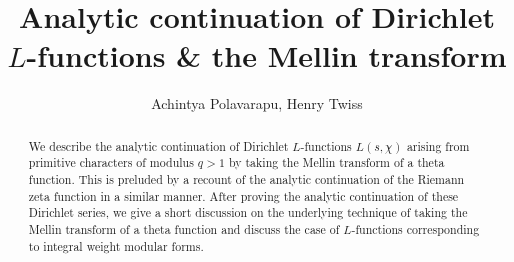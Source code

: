 \documentclass[12pt,reqno]{amsart}
\theoremstyle{definition}
\numberwithin{equation}{section}
\begin{document}
\begin{abstract}
    We describe the analytic continuation of Dirichlet $L$-functions $L(s,\chi)$ arising from primitive characters of modulus $q > 1$ by taking the Mellin transform of a theta function. This is preluded by a recount of the analytic continuation of the Riemann zeta function in a similar manner. After proving the analytic continuation of these Dirichlet series, we give a short discussion on the underlying technique of taking the Mellin transform of a theta function and discuss the case of $L$-functions corresponding to integral weight modular forms.
\end{abstract}

\title{Analytic continuation of Dirichlet $L$-functions \& the Mellin transform}
\author{Achintya Polavarapu, Henry Twiss}
\maketitle
\thispagestyle{empty}
\end{document}

